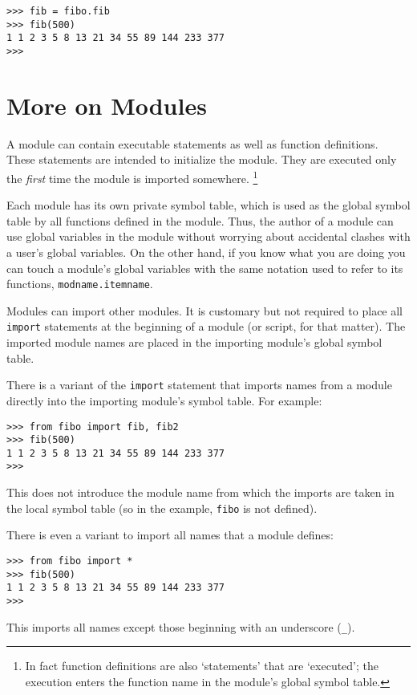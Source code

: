 \bcode\begin{verbatim}
>>> fib = fibo.fib
>>> fib(500)
1 1 2 3 5 8 13 21 34 55 89 144 233 377
>>> 
\end{verbatim}\ecode

\section{More on Modules}

A module can contain executable statements as well as function
definitions.
These statements are intended to initialize the module.
They are executed only the
{\em first}
time the module is imported somewhere.%
\footnote{
        In fact function definitions are also `statements' that are
        `executed'; the execution enters the function name in the
        module's global symbol table.
}

Each module has its own private symbol table, which is used as the
global symbol table by all functions defined in the module.
Thus, the author of a module can use global variables in the module
without worrying about accidental clashes with a user's global
variables.
On the other hand, if you know what you are doing you can touch a
module's global variables with the same notation used to refer to its
functions,
{\tt modname.itemname}.

Modules can import other modules.
It is customary but not required to place all
{\tt import}
statements at the beginning of a module (or script, for that matter).
The imported module names are placed in the importing module's global
symbol table.

There is a variant of the
{\tt import}
statement that imports names from a module directly into the importing
module's symbol table.
For example:

\bcode\begin{verbatim}
>>> from fibo import fib, fib2
>>> fib(500)
1 1 2 3 5 8 13 21 34 55 89 144 233 377
>>> 
\end{verbatim}\ecode
%
This does not introduce the module name from which the imports are taken
in the local symbol table (so in the example, {\tt fibo} is not
defined).

There is even a variant to import all names that a module defines:

\bcode\begin{verbatim}
>>> from fibo import *
>>> fib(500)
1 1 2 3 5 8 13 21 34 55 89 144 233 377
>>> 
\end{verbatim}\ecode
%
This imports all names except those beginning with an underscore
({\tt _}).

